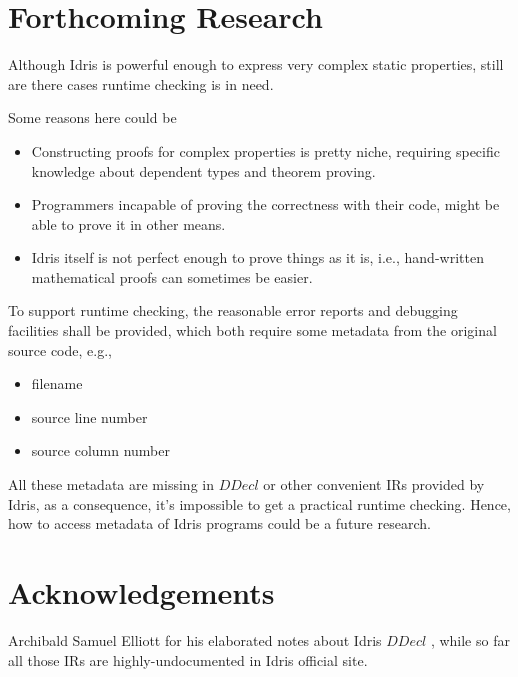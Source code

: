\documentclass[a1,portrait]{a1poster}
\begin{document}
\begin{multicols}{2}
\color{Black}

\section*{Forthcoming Research}

Although Idris is powerful enough to express very complex static properties,
still are there cases runtime checking is in need.

Some reasons here could be

\begin{itemize}
    \setlength\itemsep{-0.2em}
    \item Constructing proofs for complex properties is pretty niche, requiring specific knowledge about dependent types and theorem proving.
    \item Programmers incapable of proving the correctness with their code, might be able to prove it in other means.
    \item Idris itself is not perfect enough to prove things as it is, i.e., hand-written mathematical proofs can sometimes be easier.
\end{itemize}

To support runtime checking, the reasonable error reports and debugging facilities shall be provided,
which both require some metadata from the original source code, e.g.,

\begin{itemize}
    \setlength\itemsep{-0.2em}
    \item filename
    \item source line number
    \item source column number
\end{itemize}

All these metadata are missing in $DDecl$ or other convenient IRs provided by Idris,
as a consequence, it's impossible to get a practical runtime checking. Hence, how to access
metadata of Idris programs could be a future research.



\section*{Acknowledgements}

Archibald Samuel Elliott for his elaborated notes about Idris $DDecl$ \cite {elliott2015concurrency}, while so far all those IRs are highly-undocumented in Idris official site.

\begin{small}%
\begin{multicols}{2}%
\nocite{*} %
\end{multicols}
\end{small}



\end{multicols}
\end{document}
